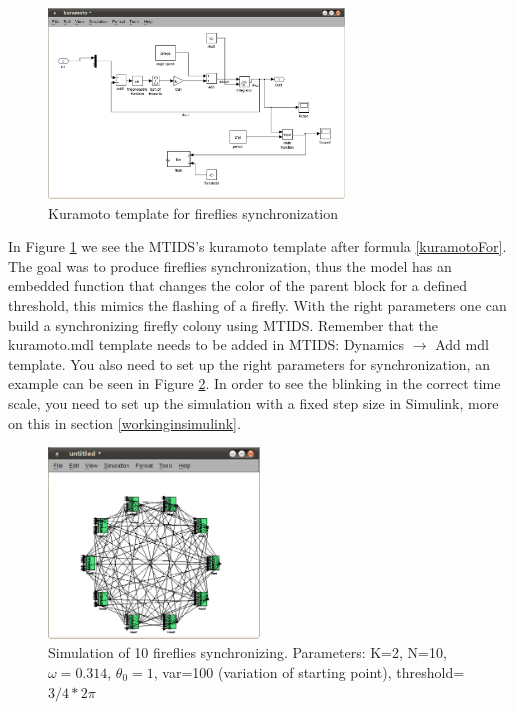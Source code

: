 \documentclass[a4paper,twoside, openright,12pt]{report}
\begin{document}
\begin{figure}[htb]
\centering
\includegraphics[width=0.7\textwidth]{pics/screenKuramoto.eps}
\caption[MTIDS Kuramoto Template]{Kuramoto template for fireflies synchronization}
\label{templateKuramotoFig}
\end{figure}
 
In Figure \ref{templateKuramotoFig} we see  the MTIDS's kuramoto template after formula \ref{kuramotoFor}. The goal was to produce fireflies synchronization, thus
the model has an embedded function that changes the color of the parent block for a defined threshold, this mimics the flashing of a firefly.
With the right parameters one can build a synchronizing firefly colony using MTIDS. Remember that the kuramoto.mdl template needs to be added in MTIDS:
Dynamics $\rightarrow$ Add mdl template. You also need to set up the right parameters for synchronization, an example can be seen in Figure \ref{syncFig}.
In order to see the blinking in the correct time scale, you need to set up the simulation with a fixed step size in Simulink, more on this in section 
\ref{workinginsimulink}.



\begin{figure}[htb]
\centering
\includegraphics[width=0.5\textwidth]{pics/screenfireflies.eps}
\caption[MTIDS fireflies synchronization]{Simulation of 10 fireflies synchronizing. Parameters: K=2, N=10, $\omega=0.314$, $\theta_0=1$, var=100 (variation of starting point), threshold= $3/4*2\pi$}
\label{syncFig}
\end{figure}
\end{document}
